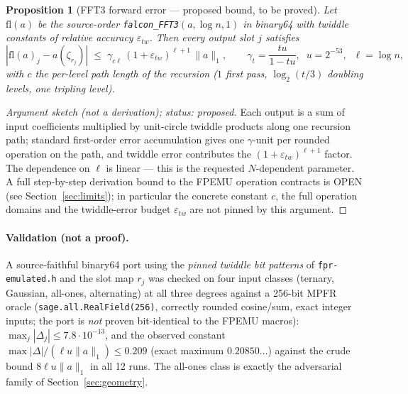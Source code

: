 \documentclass[11pt,a4paper]{article}
\newtheorem{proposition}{Proposition}
\theoremstyle{remark}
\newcommand{\OPEN}{\textsf{OPEN}}
\begin{document}
\begin{proposition}[FFT3 forward error --- proposed bound, to be proved]
\label{prop:fft3}
Let $\mathrm{fl}(a)$ be the source-order \texttt{falcon\_FFT3}$(a,\log n,1)$
in binary64 with twiddle constants of relative accuracy $\varepsilon_{tw}$.
Then every output slot $j$ satisfies
\[
 |\mathrm{fl}(a)_j - a(\zeta_{r_j})|
 \;\le\; \gamma_{c\ell}\,(1+\varepsilon_{tw})^{\ell+1}\,\|a\|_1,
 \qquad \gamma_t=\frac{tu}{1-tu},\;\; u=2^{-53},\;\; \ell=\log n,
\]
with $c$ the per-level path length of the recursion ($1$ first pass,
$\log_2(t/3)$ doubling levels, one tripling level).
\end{proposition}

\begin{proof}[Argument sketch (not a derivation); status: proposed]
Each output is a sum of input coefficients multiplied by unit-circle twiddle
products along one recursion path; standard first-order error accumulation
gives one $\gamma$-unit per rounded operation on the path, and twiddle error
contributes the $(1+\varepsilon_{tw})^{\ell+1}$ factor. The dependence on
$\ell$ is linear --- this is the requested $N$-dependent parameter. A full
step-by-step derivation bound to the FPEMU operation contracts is
\OPEN{} (see Section~\ref{sec:limits}); in particular the concrete constant
$c$, the full operation domains and the twiddle-error budget
$\varepsilon_{tw}$ are not pinned by this argument.
\end{proof}

\paragraph{Validation (not a proof).} A source-faithful binary64 port using
the \emph{pinned twiddle bit patterns} of \texttt{fpr-emulated.h} and the
slot map $r_j$ was checked on four input classes (ternary, Gaussian,
all-ones, alternating) at all three degrees against a 256-bit MPFR oracle
(\texttt{sage.all.RealField(256)}, correctly rounded cosine/sum, exact
integer inputs; the port is \emph{not} proven bit-identical to the FPEMU
macros): $\max_j|\Delta_j|\le 7.8\cdot 10^{-13}$, and the observed constant
$\max|\Delta|/(\ell u\|a\|_1)\le 0.209$ (exact maximum $0.20850\ldots$)
against the crude bound $8\ell u\|a\|_1$ in all 12 runs. The all-ones class
is exactly the adversarial family of Section~\ref{sec:geometry}.
\end{document}
